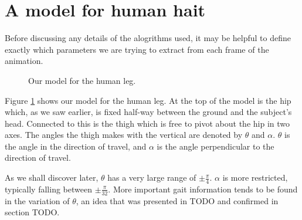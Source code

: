 \section{A model for human hait}

Before discussing any details of the alogrithms used, it may be helpful to define exactly which parameters
we are trying to extract from each frame of the animation.

\begin{figure}[b]
	\centering
	\qquad
	\caption{Our model for the human leg.}
	\label{ModelImages}
\end{figure}

Figure \ref{ModelImages} shows our model for the human leg.
At the top of the model is the hip which, as we saw earlier, is fixed half-way between the ground and the subject's head.
Connected to this is the thigh which is free to pivot about the hip in two axes.
The angles the thigh makes with the vertical are denoted by $\theta$ and $\alpha$.
$\theta$ is the angle in the direction of travel, and $\alpha$ is the angle perpendicular to the direction of travel.

As we shall discover later, $\theta$ has a very large range of $\pm \frac{\pi}{4}$.
$\alpha$ is more restricted, typically falling between $\pm \frac{\pi}{32}$.
More important gait information tends to be found in the variation of $\theta$, an idea that was presented in TODO
and confirmed in section TODO.
